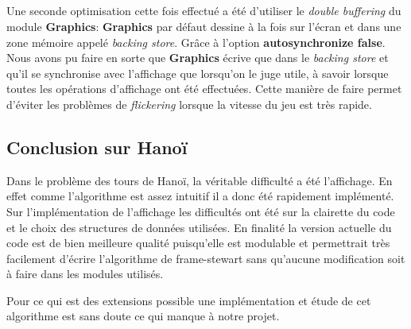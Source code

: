 \documentclass[a4paper,11pt]{article}
\begin{document}
\subparagraph{}
Une seconde optimisation cette fois effectué a été d'utiliser le \textit{double buffering} du module \textbf{Graphics}:
\textbf{Graphics} par défaut \og dessine \fg à la fois sur l'écran et dans une zone mémoire appelé \textit{backing store}.
Grâce à l'option \textbf{autosynchronize false}.
Nous avons pu faire en sorte que \textbf{Graphics} écrive que dans le \textit{backing store} et qu'il se synchronise avec l'affichage que lorsqu'on le juge utile, à savoir lorsque toutes les opérations d'affichage ont été effectuées.
Cette manière de faire permet d'éviter les problèmes de \textit{flickering} lorsque la vitesse du jeu est très rapide.
\subsection{Conclusion sur Hanoï}
Dans le problème des tours de Hanoï, la véritable difficulté a été l'affichage. 
En effet comme l'algorithme est assez intuitif il a donc été rapidement implémenté.
Sur l'implémentation de l'affichage les difficultés ont été sur la clairette du code et le choix des structures de données utilisées.
En finalité la version actuelle du code est de bien meilleure qualité puisqu'elle est modulable et permettrait très facilement d'écrire l'algorithme de frame-stewart sans qu'aucune modification soit à faire dans les modules utilisés.

Pour ce qui est des extensions possible une implémentation et étude de cet algorithme est sans doute ce qui manque à notre projet.
 
\end{document}
